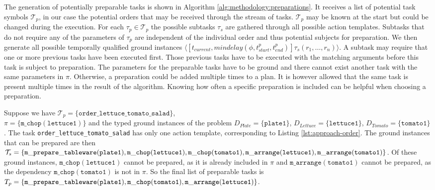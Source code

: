 The generation of potentially preparable tasks is shown in Algorithm \ref{alg:methodology:preparations}.
It receives a list of potential task symbols $\mathcal{T}_p$, in our case the potential orders that may be received through the stream of tasks.
$\mathcal{T}_p$ may be known at the start but could be changed during the execution.
For each $\tau_p \in \mathcal{T}_p$ the possible subtasks $\tau_s$ are gathered through all possible action templates.
Subtasks that do not require any of the parameters of $\tau_p$ are independent of the individual order and thus potential subjects for preparation.
We then generate all possible temporally qualified ground instances $\langle[t_{current}, mindelay(\phi,t^p_{start}, t^p_{end})] \tau_s(r_1,\dots,r_n) \rangle$.
A subtask may require that one or more previous tasks have been executed first.
Those previous tasks have to be executed with the matching arguments before this task is subject to preparation.
The parameters for the preparable tasks have to be ground and there cannot exist another task with the same parameters in $\pi$.
Otherwise, a preparation could be added multiple times to a plan.
It is however allowed that the same task is present multiple times in the result of the algorithm.
Knowing how often a specific preparation is included can be helpful when choosing a preparation.


\begin{example}
  Suppose we have $\mathcal{T}_p = \{\mathtt{order\_lettuce\_tomato\_salad}\}$, \\ $\pi=\{\mathtt{m\_chop(lettuce1)}\}$ and the typed ground instances of the problem $D_{Plate}=\{\mathtt{plate1}\}$, $D_{Lettuce}=\{\mathtt{lettuce1}\}$, $D_{Tomato}=\{\mathtt{tomato1}\}$.
  The task \verb|order_lettuce_tomato_salad| has only one action template, corresponding to Listing \ref{lst:approach-order}.
  The ground instances that can be prepared are then $\mathcal{T}_s=\{\mathtt{m\_prepare\_tableware(plate1)}, \mathtt{m\_chop(lettuce1)},\\ \mathtt{m\_chop(tomato1)}, \mathtt{m\_arrange(lettuce1)}, \mathtt{m\_arrange(tomato1)}\}$.
  Of these ground instances, $\mathtt{m\_chop(lettuce1)}$ cannot be prepared, as it is already included in $\pi$ and $\mathtt{m\_arrange(tomato1)}$ cannot be prepared, as the dependency $\mathtt{m\_chop(tomato1)}$ is not in $\pi$.
  So the final list of preparable tasks is $T_p=\{\mathtt{m\_prepare\_tableware(plate1)}, \mathtt{m\_chop(tomato1)},\\ \mathtt{m\_arrange(lettuce1)}\}$.
\end{example}

